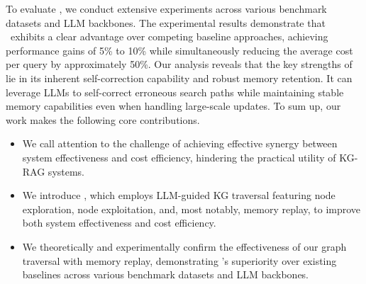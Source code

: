 To evaluate \ours, we conduct extensive experiments across various benchmark datasets and LLM backbones. The experimental results demonstrate that \ours~exhibits a clear advantage over competing baseline approaches, achieving performance gains of 5\% to 10\% while simultaneously reducing the average cost per query by approximately 50\%. Our analysis reveals that the key strengths of \ours~ lie in its inherent self-correction capability and robust memory retention. It can leverage LLMs to self-correct erroneous search paths while maintaining stable memory capabilities even when handling large-scale updates. To sum up, our work makes the following core contributions.
\begin{itemize}[leftmargin = 15pt]
    \item We call attention to the challenge of achieving effective synergy between system effectiveness and cost efficiency, hindering the practical utility of KG-RAG systems.
    \item We introduce \ours, which employs LLM-guided KG traversal featuring node exploration, node exploitation, and, most notably, memory replay, to improve both system effectiveness and cost efficiency.
    \item We theoretically and experimentally confirm the effectiveness of our graph traversal with memory replay, demonstrating \ours's superiority over existing baselines across various benchmark datasets and LLM backbones.
\end{itemize}

